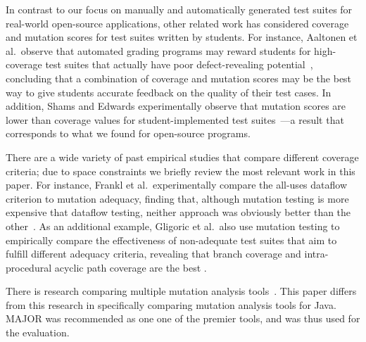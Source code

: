 In contrast to our focus on manually and automatically generated test suites for real-world open-source applications, other related work has considered coverage and mutation scores for test suites written by students. For instance, Aaltonen et al.\ observe that automated grading programs may reward students for high-coverage test suites that actually have poor defect-revealing potential~\cite{aaltonen:2010:mav:1869542.1869567}, concluding that a combination of coverage and mutation scores may be the best way to give students accurate feedback on the quality of their test cases.  In addition, Shams and Edwards experimentally observe that mutation scores are lower than coverage values for student-implemented test suites~\cite{shams2013}---a result that corresponds to what we found for open-source programs.

There are a wide variety of past empirical studies that compare different coverage criteria; due to space constraints we
briefly review the most relevant work in this paper. For instance, Frankl et al.\ experimentally compare the all-uses dataflow
criterion to mutation adequacy, finding that, although mutation testing is more expensive that dataflow testing, neither
approach was obviously better than the other~\cite{frankl1997}. As an additional example, Gligoric et al.\ also use
mutation testing to empirically compare the effectiveness of non-adequate test suites that aim to fulfill different
adequacy criteria, revealing that branch coverage and intra-procedural acyclic path coverage are the best
\cite{gligoric2013}.


There is research comparing multiple mutation analysis tools~\cite{ComparingAutomatedMutationTools:2013}. This paper differs from this research in specifically comparing mutation analysis tools for Java. MAJOR was recommended as one one of the premier tools, and was thus used for the evaluation.
